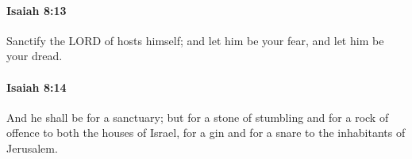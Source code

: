 		\paragraph{Isaiah 8:13} %
			\label{ISAIAH-8-13}

			Sanctify the LORD of hosts himself; and let him be your fear, and let him be your dread.


		\paragraph{Isaiah 8:14} %
			\label{ISAIAH-8-14}

			And he shall be for a sanctuary; but for a stone of stumbling and for a rock of offence to both the houses of Israel, for a gin and for a snare to the inhabitants of Jerusalem.


